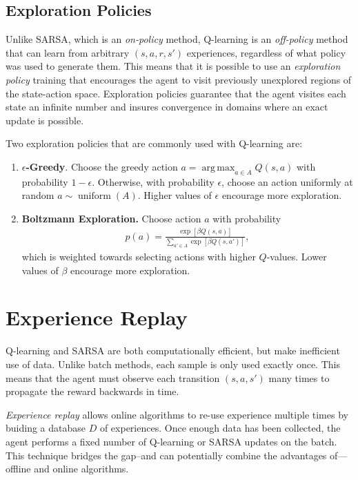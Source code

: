 \documentclass[11pt]{article}
\numberwithin{equation}{section}
\numberwithin{figure}{section}
\DeclareMathOperator*{\argmax}{arg\,max}
\DeclareMathOperator{\uniform}{uniform}
\begin{document}

\subsection{Exploration Policies}
Unlike SARSA, which is an \emph{on-policy} method,  Q-learning is an
\emph{off-policy} method that can learn from arbitrary $(s, a, r, s')$
experiences, regardless of what policy was used to generate them. This means
that it is possible to use an \emph{exploration policy} training that
encourages the agent to visit previously unexplored regions of the state-action
space. Exploration policies guarantee that the agent visites each state an
infinite number and insures convergence in domains where an exact update is
possible.

Two exploration policies that are commonly used with Q-learning are:
\begin{enumerate}
    \item \textbf{$\epsilon$-Greedy}. Choose the greedy action $a = \argmax_{a
        \in A} Q(s, a)$ with probability $1 - \epsilon$. Otherwise, with probability
        $\epsilon$, choose an action uniformly at random $a \sim \uniform(A)$. Higher
        values of $\epsilon$ encourage more exploration.
    \item \textbf{Boltzmann Exploration.} Choose action $a$ with probability
        \begin{align*}
            p(a) = \frac{\exp\left[ \beta Q(s, a) \right]}
                        {\sum_{a' \in A} \exp\left[ \beta Q(s, a') \right]},
        \end{align*}
        which is weighted towards selecting actions with higher $Q$-values. Lower
        values of $\beta$ encourage more exploration.
\end{enumerate}

\section{Experience Replay}
Q-learning and SARSA are both computationally efficient, but make inefficient
use of data. Unlike batch methods, each sample is only used exactly once. This
means that the agent must observe each transition $(s, a, s')$ many times to
propagate the reward backwards in time.

\emph{Experience replay} allows online algorithms to re-use experience multiple
times by buiding a database $D$ of experiences.  Once enough data has been
collected, the agent performs a fixed number of Q-learning or SARSA updates on
the batch. This technique bridges the gap--and can potentially combine the
advantages of---offline and online algorithms.
\end{document}
